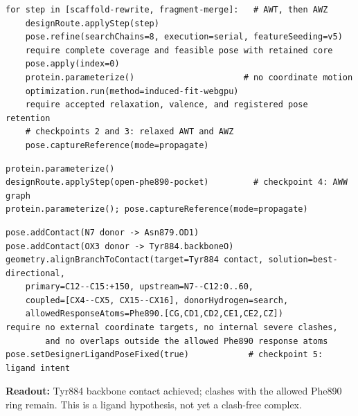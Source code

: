 \documentclass[11pt]{article}
\begin{document}
\begin{small}
\begin{minipage}{\linewidth}
\begin{lstlisting}[style=sosreadable]
for step in [scaffold-rewrite, fragment-merge]:   # AWT, then AWZ
    designRoute.applyStep(step)
    pose.refine(searchChains=8, execution=serial, featureSeeding=v5)
    require complete coverage and feasible pose with retained core
    pose.apply(index=0)
    protein.parameterize()                      # no coordinate motion
    optimization.run(method=induced-fit-webgpu)
    require accepted relaxation, valence, and registered pose retention
    # checkpoints 2 and 3: relaxed AWT and AWZ
    pose.captureReference(mode=propagate)
\end{lstlisting}
\end{minipage}

\begin{minipage}{\linewidth}
\begin{lstlisting}[style=sosreadable]
protein.parameterize()
designRoute.applyStep(open-phe890-pocket)         # checkpoint 4: AWW graph
protein.parameterize(); pose.captureReference(mode=propagate)
\end{lstlisting}
\end{minipage}

\begin{minipage}{\linewidth}
\begin{lstlisting}[style=sosreadable]
pose.addContact(N7 donor -> Asn879.OD1)
pose.addContact(OX3 donor -> Tyr884.backboneO)
geometry.alignBranchToContact(target=Tyr884 contact, solution=best-directional,
    primary=C12--C15:+150, upstream=N7--C12:0..60,
    coupled=[CX4--CX5, CX15--CX16], donorHydrogen=search,
    allowedResponseAtoms=Phe890.[CG,CD1,CD2,CE1,CE2,CZ])
require no external coordinate targets, no internal severe clashes,
        and no overlaps outside the allowed Phe890 response atoms
pose.setDesignerLigandPoseFixed(true)            # checkpoint 5: ligand intent
\end{lstlisting}
{\small\textcolor{molteal}{\textbf{Readout:}} Tyr884 backbone contact achieved; clashes with the allowed Phe890 ring remain. This is a ligand hypothesis, not yet a clash-free complex.}
\end{minipage}


\end{small}
\end{document}
